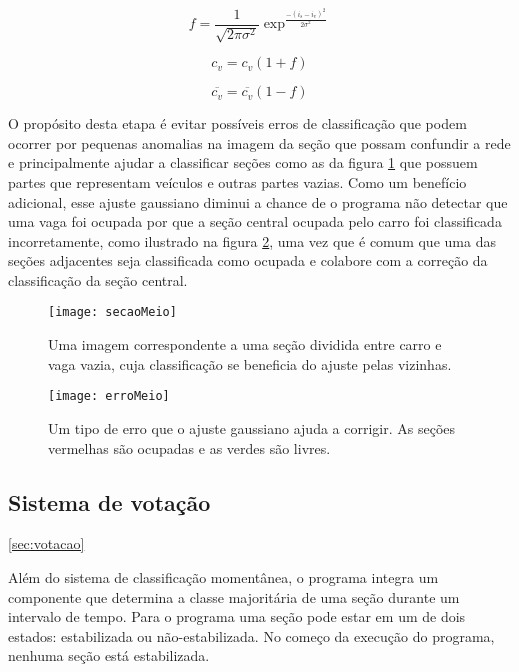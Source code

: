 \begin{equation}
	f = \frac{1}{\sqrt{2\pi\sigma^2}} \exp^{\frac{-(i_s-i_v)^2}{2\sigma^2}} 
\label{eq:gaussiana}
\end{equation}

\begin{equation}
	c_v  = c_v(1+f)
\label{eq:novoCv}
\end{equation}

\begin{equation}
	\overline{c_v}  = \overline{c_v}(1-f)
\label{eq:novoRCv}
\end{equation}

O propósito desta etapa é evitar possíveis erros de classificação que podem ocorrer por pequenas anomalias na imagem da seção que possam confundir a rede e principalmente ajudar a classificar seções como as da figura \ref{fig:secaoMeio} que possuem partes que representam veículos e outras partes vazias. Como um benefício adicional, esse ajuste gaussiano diminui a chance de o programa não detectar que uma vaga foi ocupada por que a seção central ocupada pelo carro foi classificada incorretamente, como ilustrado na figura \ref{fig:erromeio}, uma vez que é comum que uma das seções adjacentes seja classificada como ocupada e colabore com a correção da classificação da seção central.


\begin{figure}
	\centering
	\texttt{[image: secaoMeio]}
	\label{fig:secaoMeio}
	\caption{Uma imagem correspondente a uma seção dividida entre carro e vaga vazia, cuja classificação se beneficia do ajuste pelas vizinhas.}
	\centering
\end{figure}

\begin{figure}
	\centering
	\texttt{[image: erroMeio]}
	\label{fig:erromeio}
	\caption{Um tipo de erro que o ajuste gaussiano ajuda a corrigir. As seções vermelhas são ocupadas e as verdes são livres.}
	\centering
\end{figure}

\subsection{Sistema de votação}\ref{sec:votacao}

Além do sistema de classificação momentânea, o programa integra um componente que determina a classe majoritária de uma seção durante um intervalo de tempo. Para o programa uma seção pode estar em um de dois estados: estabilizada ou não-estabilizada. No começo da execução do programa, nenhuma seção está estabilizada. 

